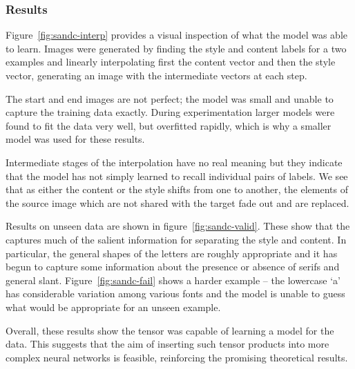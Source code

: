 \subsubsection{Results}
Figure~\ref{fig:sandc-interp} provides a visual inspection of what the model was able to
learn. Images were generated by finding the style and content labels for a two examples and
linearly interpolating first the content vector and then the style vector, generating an
image with the intermediate vectors at each step. 

The start and end images are not perfect; the model was small and unable to capture the training
data exactly. During experimentation larger models were found to fit the data very well, but 
overfitted rapidly, which is why a smaller model was used for these results.

Intermediate stages of the interpolation have no real meaning but they indicate that the model has
not simply learned to recall individual pairs of labels. We see that as either the content or
the style shifts from one to another, the elements of the source image which are not shared with
the target fade out and are replaced.

Results on unseen data are shown in figure~\ref{fig:sandc-valid}. These show that the captures
much of the salient information for separating the style and content. In
particular, the general shapes of the letters are roughly appropriate and it has begun to capture
some information about the presence or absence of serifs and general slant.
Figure~\ref{fig:sandc-fail} shows a harder example -- the lowercase `a' has considerable variation
among various fonts and the model is unable to guess what would be appropriate for an unseen
example. 

Overall, these results show the tensor was capable of learning a model for the data.
This suggests that the aim of inserting such tensor products into more complex neural networks
is feasible, reinforcing the promising theoretical results.



